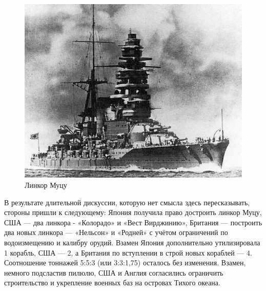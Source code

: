 \begin{figure}[h!tb] 
	\centering\includegraphics[scale=0.5]{Glava7/DRipb4WQs_c.jpg}
	\caption{Линкор Муцу}%
\end{figure}

 В результате длительной дискуссии, которую нет смысла здесь пересказывать, стороны пришли к следующему: Япония получила право достроить линкор Муцу, США — два линкора - «Колорадо» и «Вест Вирджинию», Британия — построить два новых линкора — «Нельсон» и «Родней» с учётом ограничений по водоизмещению и калибру орудий. Взамен Япония дополнительно утилизировала 1 корабль, США — 2, а Британия по вступлении в строй новых кораблей — 4. Соотношение тоннажей 5:5:3 (или 3:3:1,75) осталось без изменения. Взамен, немного подсластив пилюлю, США и Англия согласились ограничить строительство и укрепление военных баз на островах Тихого океана.

